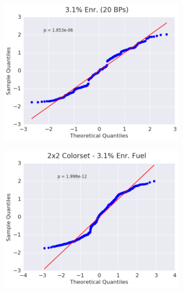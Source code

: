 \begin{figure}[h!]
\begin{subfigure}{0.5\textwidth}
  \centering
  \includegraphics[width=\linewidth]{figures/patterns/assm-3.1-20BPs/quantile/assm-31-20BPs-capt-1}
  \caption{}
  \label{fig:chap9-qq-assm-3.1-20BPs-capt}
\end{subfigure}%
\begin{subfigure}{0.5\textwidth}
  \centering
  \includegraphics[width=\linewidth]{figures/patterns/2x2/quantile/31-enr-capt-1}
  \caption{}
  \label{fig:chap9-qq-2x2-3.1-capt}
\end{subfigure}
\begin{subfigure}{0.5\textwidth}
  \centering

\end{subfigure}
\end{figure}

